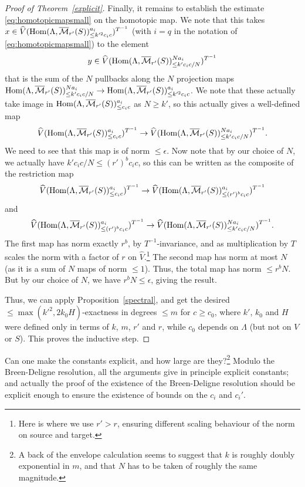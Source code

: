 \begin{proof}[Proof of Theorem~\ref{explicit}]
Finally, it remains to establish the estimate \eqref{eq:homotopicmapsmall} on the homotopic map. We note that this takes $x\in \widehat{V}(\operatorname{Hom}(\Lambda,\overline{\mathcal M}_{r'}(S))_{\leq k'^2c_ic}^{a_i})^{T^{-1}}$ (with $i=q$ in the notation of \eqref{eq:homotopicmapsmall}) to the element
\[
y\in \widehat{V}(\operatorname{Hom}(\Lambda,\overline{\mathcal M}_{r'}(S))_{\leq k'c_ic/N}^{Na_i})^{T^{-1}}
\]
that is the sum of the $N$ pullbacks along the $N$ projection maps $\operatorname{Hom}(\Lambda,\overline{\mathcal M}_{r'}(S))_{\leq k'c_ic/N}^{Na_i}\to \operatorname{Hom}(\Lambda,\overline{\mathcal M}_{r'}(S))_{\leq k'^2c_ic}^{a_i}$. We note that these actually take image in $\operatorname{Hom}(\Lambda,\overline{\mathcal M}_{r'}(S))_{\leq c_ic}^{a_i}$ as $N\geq k'$, so this actually gives a well-defined map
\[
\widehat{V}(\operatorname{Hom}(\Lambda,\overline{\mathcal M}_{r'}(S))_{\leq c_ic}^{a_i})^{T^{-1}}\to \widehat{V}(\operatorname{Hom}(\Lambda,\overline{\mathcal M}_{r'}(S))_{\leq k'c_ic/N}^{Na_i})^{T^{-1}}.
\]
We need to see that this map is of norm $\leq \epsilon$. Now note that by our choice of $N$, we actually have $k'c_ic/N\leq (r')^b c_ic$, so this can be written as the composite of the restriction map
\[
\widehat{V}(\operatorname{Hom}(\Lambda,\overline{\mathcal M}_{r'}(S))_{\leq c_ic}^{a_i})^{T^{-1}}\to \widehat{V}(\operatorname{Hom}(\Lambda,\overline{\mathcal M}_{r'}(S))_{\leq (r')^b c_ic}^{a_i})^{T^{-1}}
\]
and
\[
\widehat{V}(\operatorname{Hom}(\Lambda,\overline{\mathcal M}_{r'}(S))_{\leq (r')^b c_ic}^{a_i})^{T^{-1}}\to \widehat{V}(\operatorname{Hom}(\Lambda,\overline{\mathcal M}_{r'}(S))_{\leq k'c_ic/N}^{Na_i})^{T^{-1}}.
\]
The first map has norm exactly $r^b$, by $T^{-1}$-invariance, and as multiplication by $T$ scales the norm with a factor of $r$ on $\widehat{V}$.\footnote{Here is where we use $r'>r$, ensuring different scaling behaviour of the norm on source and target.} The second map has norm at most $N$ (as it is a sum of $N$ maps of norm $\leq 1$). Thus, the total map has norm $\leq r^bN$. But by our choice of $N$, we have $r^bN\leq \epsilon$, giving the result.

Thus, we can apply Proposition~\ref{spectral}, and get the desired $\leq \max(k'^2,2k_0H)$-exactness in degrees $\leq m$ for $c\geq c_0$, where $k'$, $k_0$ and $H$ were defined only in terms of $k$, $m$, $r'$ and $r$, while $c_0$ depends on $\Lambda$ (but not on $V$ or $S$). This proves the inductive step.
\end{proof}

\begin{question} Can one make the constants explicit, and how large are they?\footnote{A back of the envelope calculation seems to suggest that $k$ is roughly doubly exponential in $m$, and that $N$ has to be taken of roughly the same magnitude.} Modulo the Breen-Deligne resolution, all the arguments give in principle explicit constants; and actually the proof of the existence of the Breen-Deligne resolution should be explicit enough to ensure the existence of bounds on the $c_i$ and $c_i'$.
\end{question}

